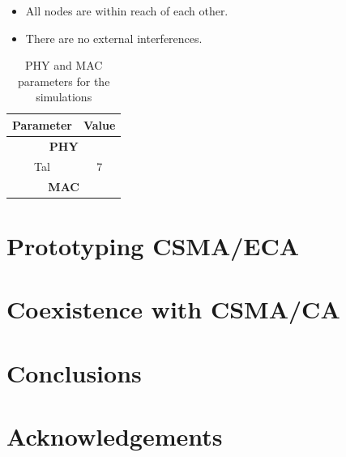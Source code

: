 \documentclass[a4paper,journal]{IEEEtran}
\begin{document}
	\begin{itemize}
		\item All nodes are within reach of each other.
		\item There are no external interferences.
	\end{itemize}
	
	\begin{table}
		\centering
		\caption{PHY and MAC parameters for the simulations}
		\label{tab:mac-params}
		\begin{tabular}{|c|c|}
			\hline
			{\bfseries Parameter} & {\bfseries Value}\\
			\hline
			\multicolumn{2}{|c|}{{\bfseries PHY}}\\
			\hline
			Tal & 7\\
			\hline
			\multicolumn{2}{|c|}{{\bfseries MAC}}\\
			\hline
		\end{tabular}
	\end{table}
	
	

\section{Prototyping CSMA/ECA}\label{prototype}
\section{Coexistence with CSMA/CA}\label{prototypeResults}
\section{Conclusions}\label{conclusions}
\section{Acknowledgements}




\end{document}
